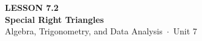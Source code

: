 \documentclass[aspectratio=169, 11pt]{beamer}
\begin{document}
{
\begin{frame}[plain]
  \vspace{2.8cm}\hspace{0.55cm}%
  \begin{minipage}{0.9\textwidth}
    {\color{goldacc}\bfseries\small LESSON 7.2}\\[0.5cm]
    {\color{white}\bfseries\LARGE Special Right Triangles}\\[1.2cm]
    {\color{mistmid}\small Algebra, Trigonometry, and Data Analysis~$\cdot$~Unit 7}
  \end{minipage}
\end{frame}
}

\begin{frame}[t, plain]
\end{frame}
\end{document}
